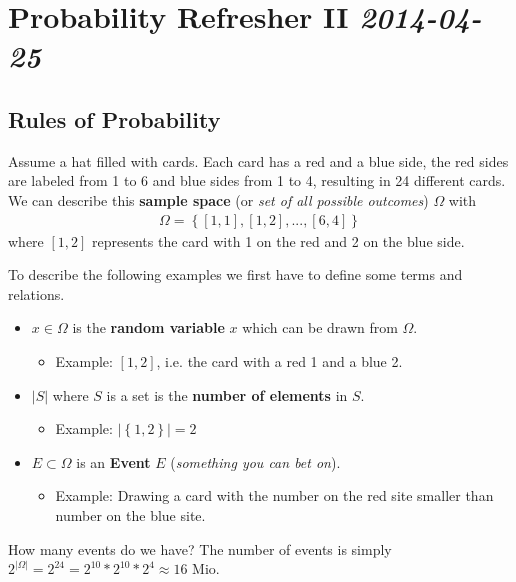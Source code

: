 \section[Probability Refresher II]{Probability Refresher II \small{\textit{2014-04-25}}}

\subsection{Rules of Probability}
Assume a hat filled with cards. Each card has a red and a blue side, the red sides 
are labeled from 1 to 6 and blue sides from 1 to 4, resulting in 24 different cards.
We can describe this \textbf{sample space} (or \textit{set of all possible outcomes}) 
\textbf{$\Omega$} with
\begin{align*}
\Omega = \left\{ \left[ 1, 1\right], \left[ 1, 2\right], ..., \left[ 6, 4\right] \right\}
\end{align*}
where $\left[ 1, 2 \right]$ represents the card with 1 on the red and 2 on the blue side.

To describe the following examples we first have to define some terms and relations.

\begin{itemize}
	\item $x \in \Omega$ is the \textbf{random variable} $x$ which can be drawn from $\Omega$.
    \begin{itemize}
      \item Example: $\left[ 1, 2 \right]$, i.e. the card with a red 1 and a blue 2.
    \end{itemize}
  \item $|S|$ where $S$ is a set is the \textbf{number of elements} in $S$.
    \begin{itemize}
      \item Example: $|\left\{1,2\right\}| = 2$
    \end{itemize}
  \item $E \subset \Omega$ is an \textbf{Event} $E$ (\textit{something you can bet on}).
    \begin{itemize}
      \item Example: Drawing a card with the number on the red site smaller than number on the blue site.
    \end{itemize}
\end{itemize}

How many events do we have? The number of events is simply $2^{|\Omega|} = 2^{24} 
= 2^{10} * 2^{10} * 2^4 \approx 16\mbox{ Mio}$.

